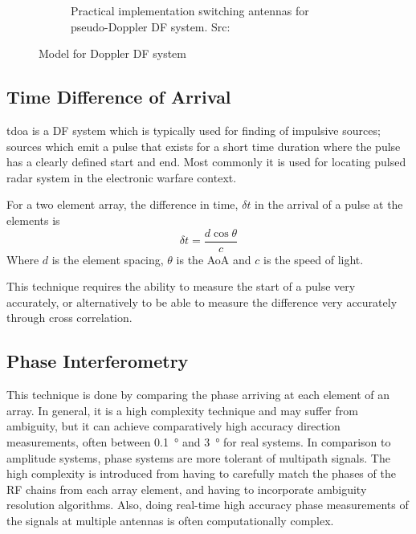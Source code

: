 \begin{figure}
\begin{subfigure}[b]{0.48\textwidth}
    \caption{Practical implementation switching antennas for pseudo-Doppler DF system. Src: \cite{jenkins1991smallaperture}}
  \end{subfigure}
  \caption{Model for Doppler DF system}
  \label{fig:lit-review-doppler-switching}
\end{figure}


\subsection{Time Difference of Arrival}
\gls{tdoa} is a DF system which is typically used for finding of impulsive sources; sources which emit a pulse that exists for a short time duration where the pulse has a clearly defined start and end. Most commonly it is used for locating pulsed radar system in the electronic warfare context.

For a two element array, the difference in time, \(\delta t\) in the arrival of a pulse at the elements is
\begin{equation}
  \delta t = \frac{d \cos \theta}{c}
\end{equation}
Where \(d\) is the element spacing, \(\theta\) is the AoA and \(c\) is the speed of light.

This technique requires the ability to measure the start of a pulse very accurately, or alternatively to be able to measure the difference very accurately through cross correlation. 

\subsection{Phase Interferometry}
This technique is done by comparing the phase arriving at each element of an array.
In general, it is a high complexity technique and may suffer from ambiguity, but it can achieve comparatively high accuracy direction measurements, often between \SI{0.1}{\degree} and \SI{3}{\degree} for real systems. 
In comparison to amplitude systems, phase systems are more tolerant of multipath signals. 
The high complexity is introduced from having to carefully match the phases of the RF chains from each array element, and having to incorporate ambiguity resolution algorithms. Also, doing real-time high accuracy phase measurements of the signals at multiple antennas is often computationally complex. 

